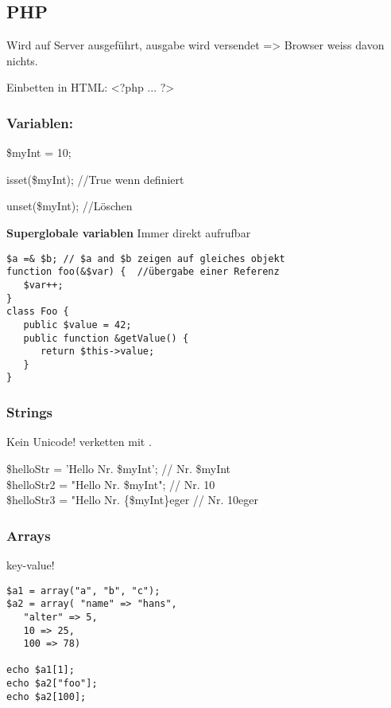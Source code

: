 \subsection{PHP}
Wird auf Server ausgeführt, ausgabe wird versendet => Browser weiss davon nichts.

Einbetten in HTML: <?php ... ?>
\subsubsection{Variablen:}
\$myInt = 10;

isset(\$myInt); //True wenn definiert

unset(\$myInt); //Löschen

\textbf{Superglobale variablen}
Immer direkt aufrufbar 

 
\begin{verbatim}
$a =& $b; // $a and $b zeigen auf gleiches objekt
function foo(&$var) {  //übergabe einer Referenz
   $var++;
}
class Foo {
   public $value = 42;
   public function &getValue() {
      return $this->value;
   }
}
\end{verbatim}
\subsubsection{Strings}
Kein Unicode! verketten mit .

\$helloStr = 'Hello Nr. \$myInt';  // Nr. \$myInt\\
\$helloStr2 = "Hello Nr. \$myInt";  // Nr. 10\\
\$helloStr3 = "Hello Nr. \{\$myInt\}eger // Nr. 10eger \newpage
\subsubsection{Arrays}
key-value!\begin{verbatim}
$a1 = array("a", "b", "c");
$a2 = array( "name" => "hans",
   "alter" => 5,
   10 => 25,
   100 => 78)

echo $a1[1];
echo $a2["foo"];
echo $a2[100];
\end{verbatim}

